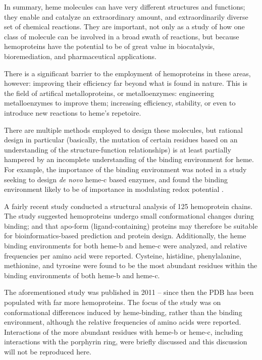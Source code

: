 \documentclass[a4paper, nobind]{templates/ociamthesis}
\begin{document}
In summary, heme molecules can have very different structures and functions; they enable and catalyze an extraordinary amount, and extraordinarily diverse set of chemical reactions. They are important, not only as a study of how one class of molecule can be involved in a broad swath of reactions, but because hemoproteins have the potential to be of great value in biocatalysis, bioremediation, and pharmaceutical applications.

There is a significant barrier to the employment of hemoproteins in these areas, however: improving their efficiency far beyond what is found in nature. This is the field of artifical metalloproteins, or metalloenzymes: engineering metalloenzymes to improve them; increasing efficiency, stability, or even to introduce new reactions to heme's repetoire.

There are multiple methods employed to design these molecules, but rational design in particular (basically, the mutation of certain residues based on an understanding of the structure-function relationships) is at least partially hampered by an incomplete understanding of the binding environment for heme. For example, the importance of the binding environment was noted in a study seeking to design \emph{de novo} heme-c based enzymes, and found the binding environment likely to be of importance in modulating redox potential \autocite{Ishida2004}.

A fairly recent study conducted a structural analysis of 125 hemoprotein chains\autocite{Li2011}. The study suggested hemoproteins undergo small conformational changes during binding; and that apo-form (ligand-containing) proteins may therefore be suitable for bioinformatics-based prediction and protein design. Additionally, the heme binding environments for both heme-b and heme-c were analyzed, and relative frequencies per amino acid were reported. Cysteine, histidine, phenylalanine, methionine, and tyrosine were found to be the most abundant residues within the binding environments of both heme-b and heme-c.~

The aforementioned study was published in 2011 -- since then the PDB has been populated with far more hemoproteins. The focus of the study was on conformational differences induced by heme-binding, rather than the binding environment, although the relative frequencies of amino acids were reported. Interactions of the more abundant residues with heme-b or heme-c, including interactions with the porphyrin ring, were briefly discussed and this discussion will not be reproduced here.
\end{document}
